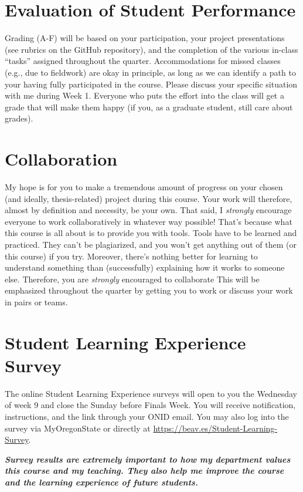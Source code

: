 \documentclass[10pt]{article}
\begin{document}
\section*{Evaluation of Student Performance}
Grading (A-F) will be based on your participation, your project presentations 
(see rubrics on the GitHub repository),
and the completion of the various in-class ``tasks'' assigned throughout the quarter.
Accommodations for missed classes (e.g., due to fieldwork) are okay in principle, as long as we can identify a path to your having fully participated in the course.
Please discuss your specific situation with me during Week 1.
Everyone who puts the effort into the class will get a grade that will make them happy (if you, as a graduate student, still care about grades).

\section*{Collaboration}
My hope is for you to make a tremendous amount of progress on your chosen (and ideally, thesis-related) project during this course.
Your work will therefore, almost by definition and necessity, be your own.
That said, I \textit{strongly} encourage everyone to work collaboratively in 
whatever way possible!
That's because what this course is all about is to provide you with tools.
Tools have to be learned and practiced.
They can't be plagiarized, and you won't get anything out of them (or this course) if you try.
Moreover, there's nothing better for learning to understand something than (successfully) explaining how it works to someone else.
Therefore, you are \textit{strongly} encouraged to collaborate
This will be emphasized throughout the quarter by getting you to work or 
discuss your work in pairs or teams.

\section*{Student Learning Experience Survey}
The online Student Learning Experience surveys will open to you the 
Wednesday of week 9 and close the Sunday before Finals Week. 
You will receive notification, instructions, and the link through your ONID email. 
You may also log into the survey via MyOregonState or directly at 
\url{https://beav.es/Student-Learning-Survey}. 

\noindent
\textit{
\textbf{Survey results are extremely important to how my department values 
this course and my teaching.
They also help me improve the course and the learning experience of future 
students.}}
\end{document}
